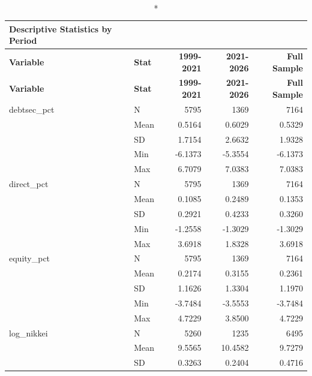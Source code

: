 \documentclass[10pt]{article}
\begin{document}
\pagestyle{empty}
\setlength{\tabcolsep}{4pt}
\renewcommand{\arraystretch}{0.85}

\begin{longtable}{l l r r r}
  \caption*{Descriptive Statistics by Period} \\
  \toprule
  \textbf{Variable} & \textbf{Stat} & \textbf{1999-2021} & \textbf{2021-2026} & \textbf{Full Sample} \\
  \midrule
  \endfirsthead
  \toprule
  \textbf{Variable} & \textbf{Stat} & \textbf{1999-2021} & \textbf{2021-2026} & \textbf{Full Sample} \\
  \midrule
  \endhead
  \bottomrule
  \endfoot
  \bottomrule
  \endlastfoot
debtsec\_pct    & N     &       5795 &       1369 &       7164\\
                & Mean  &     0.5164 &     0.6029 &     0.5329\\
                & SD    &     1.7154 &     2.6632 &     1.9328\\
                & Min   &    -6.1373 &    -5.3554 &    -6.1373\\
                & Max   &     6.7079 &     7.0383 &     7.0383\\
\addlinespace
direct\_pct     & N     &       5795 &       1369 &       7164\\
                & Mean  &     0.1085 &     0.2489 &     0.1353\\
                & SD    &     0.2921 &     0.4233 &     0.3260\\
                & Min   &    -1.2558 &    -1.3029 &    -1.3029\\
                & Max   &     3.6918 &     1.8328 &     3.6918\\
\addlinespace
equity\_pct     & N     &       5795 &       1369 &       7164\\
                & Mean  &     0.2174 &     0.3155 &     0.2361\\
                & SD    &     1.1626 &     1.3304 &     1.1970\\
                & Min   &    -3.7484 &    -3.5553 &    -3.7484\\
                & Max   &     4.7229 &     3.8500 &     4.7229\\
\addlinespace
log\_nikkei     & N     &       5260 &       1235 &       6495\\
                & Mean  &     9.5565 &    10.4582 &     9.7279\\
                & SD    &     0.3263 &     0.2404 &     0.4716\\

\end{longtable}
\end{document}
